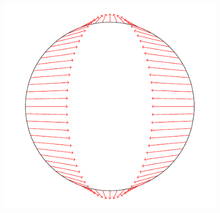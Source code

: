 \message{ !name(tangent_space_of_curves.tex)}\documentclass[a4,danish]{article}
\theoremstyle{break}
\theoremstyle{definition}
\theoremstyle{Break}
\begin{document}
\begin{figure}
  \centerline{\includegraphics[width=0.7\linewidth]{circle_vectorfield.pdf}}
\end{figure}
\end{document}
